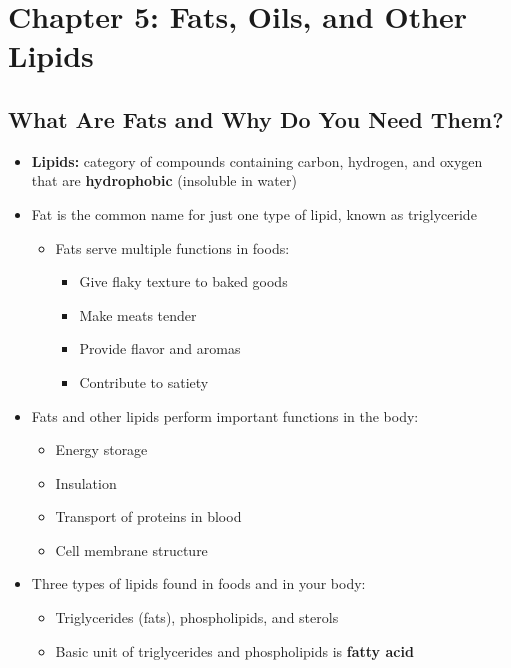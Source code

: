 \documentclass[12pt]{article}
\begin{document}
    \section{Chapter 5: Fats, Oils, and Other Lipids}
        \subsection{What Are Fats and Why Do You Need Them?}
            \begin{itemize}
                \item \textbf{Lipids:} category of compounds containing carbon, hydrogen, and oxygen that are \textbf{hydrophobic} (insoluble in water)
                \item Fat is the common name for just one type of lipid, known as triglyceride
                    \begin{itemize}
                        \item Fats serve multiple functions in foods:
                            \begin{itemize}
                                \item Give flaky texture to baked goods
                                \item Make meats tender
                                \item Provide flavor and aromas
                                \item Contribute to satiety
                            \end{itemize}
                    \end{itemize}
                \item Fats and other lipids perform important functions in the body:
                    \begin{itemize}
                        \item Energy storage
                        \item Insulation
                        \item Transport of proteins in blood
                        \item Cell membrane structure
                    \end{itemize}
                \item Three types of lipids found in foods and in your body:
                    \begin{itemize}
                        \item Triglycerides (fats), phospholipids, and sterols
                        \item Basic unit of triglycerides and phospholipids is \textbf{fatty acid}
                    \end{itemize}
            \end{itemize}
\end{document}
